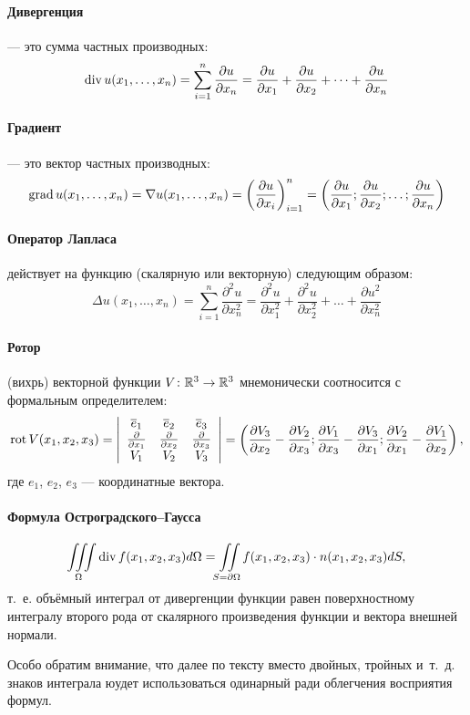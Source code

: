 \paragraph{Дивергенция}
--- это сумма частных производных:
$$
	\operatorname{div} u(x_1, \dots, x_n) =
	\sum_{i=1}^n \frac{\partial u}{\partial x_n} =
	\frac{\partial u}{\partial x_1} + \frac{\partial u}{\partial x_2} +
	\dots + \frac{\partial u}{\partial x_n}
$$

\paragraph{Градиент}
--- это вектор частных производных:
$$
	\operatorname{grad} u(x_1, \dots, x_n) =
	\nabla u(x_1, \dots, x_n) =
	\left( \frac{\partial u}{\partial x_i}\right)_{i=1}^{n} =
	\left( \frac{\partial u}{\partial x_1} ; \frac{\partial u}{\partial x_2} ;
	\dots; \frac{\partial u}{\partial x_n}\right)
$$

\paragraph{Оператор Лапласа}
действует на функцию (скалярную или векторную) следующим образом:
$$
	\Delta u(x_1, \dots, x_n) =
	\sum_{i=1}^n \frac{\partial^2 u}{\partial x_n^2} =
	\frac{\partial^2 u}{\partial x_1^2} + \frac{\partial^2 u}{\partial x_2^2} +
	\dots + \frac{\partial u^2}{\partial x_n^2}
$$

\paragraph{Ротор}
(вихрь) векторной функции
$V \colon \mathbb{R}^3 \to \mathbb{R}^3$
мнемонически соотносится с формальным определителем:
$$
	\operatorname{rot} V(x_1, x_2, x_3) =
	\left|
		\begin{array}{ccc}
			\overline{e}_{1}                           & \overline{e}_{2}                           & \overline{e}_{3} \\
			\frac{\partial}{\partial x_1} & \frac{\partial}{\partial x_2} & \frac{\partial}{\partial x_3} \\
			V_1                           & V_2                           & V_3
		\end{array}
	\right|
	=
	\left(
		\frac{\partial V_3}{\partial x_2} - \frac{\partial V_2}{\partial x_3} ;
		\frac{\partial V_1}{\partial x_3} - \frac{\partial V_3}{\partial x_1} ;
		\frac{\partial V_2}{\partial x_1} - \frac{\partial V_1}{\partial x_2}
	\right),
$$
где $e_1$, $e_2$, $e_3$ --- координатные вектора.

\paragraph{Формула Остроградского--Гаусса}
$$
	\iiint\limits_{\Omega} \operatorname{div} f(x_1, x_2, x_3) d\Omega =
	\iint\limits_{S=\partial\Omega} f(x_1, x_2, x_3) \cdot n(x_1, x_2, x_3) dS,
$$
т.~е. объёмный интеграл от дивергенции функции равен
поверхностному интегралу второго рода от скалярного произведения функции и вектора внешней нормали.

Особо обратим внимание, что далее по тексту вместо двойных, тройных и~т.~д.
знаков интеграла юудет использоваться одинарный ради облегчения восприятия формул.
